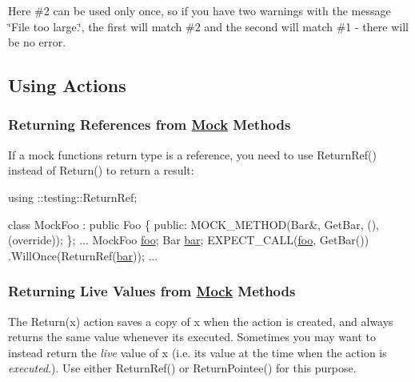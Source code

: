 

Here \#2 can be used only once, so if you have two warnings with the message {\ttfamily \char`\"{}\+File too large.\char`\"{}}, the first will match \#2 and the second will match \#1 -\/ there will be no error.

\subsection*{Using Actions}

\subsubsection*{Returning References from \mbox{\hyperlink{classMock}{Mock}} Methods}

If a mock function\textquotesingle{}s return type is a reference, you need to use {\ttfamily Return\+Ref()} instead of {\ttfamily Return()} to return a result\+:


\begin{DoxyCode}
using ::testing::ReturnRef;

\textcolor{keyword}{class }MockFoo : \textcolor{keyword}{public} Foo \{
 \textcolor{keyword}{public}:
  MOCK\_METHOD(Bar&, GetBar, (), (\textcolor{keyword}{override}));
\};
...
  MockFoo \mbox{\hyperlink{namespacefoo}{foo}};
  Bar \mbox{\hyperlink{namespacebar}{bar}};
  EXPECT\_CALL(\mbox{\hyperlink{namespacefoo}{foo}}, GetBar())
      .WillOnce(ReturnRef(\mbox{\hyperlink{namespacebar}{bar}}));
...
\end{DoxyCode}


\subsubsection*{Returning Live Values from \mbox{\hyperlink{classMock}{Mock}} Methods}

The {\ttfamily Return(x)} action saves a copy of {\ttfamily x} when the action is created, and always returns the same value whenever it\textquotesingle{}s executed. Sometimes you may want to instead return the {\itshape live} value of {\ttfamily x} (i.\+e. its value at the time when the action is {\itshape executed}.). Use either {\ttfamily Return\+Ref()} or {\ttfamily Return\+Pointee()} for this purpose.

